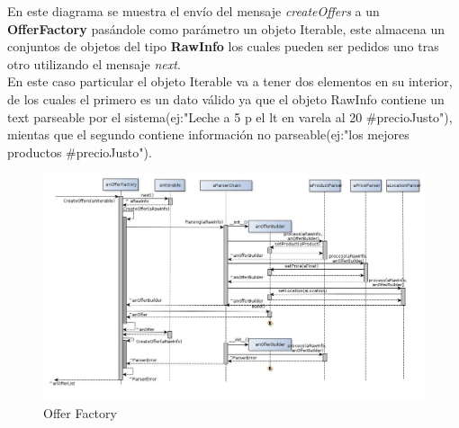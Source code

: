 \documentclass[10pt, a4paper]{article}
\begin{document}
\begin{landscape}

En este diagrama se muestra el envío del mensaje \emph{createOffers} a un \textbf{OfferFactory} pasándole como parámetro un objeto Iterable, este almacena un conjuntos de objetos del tipo \textbf{RawInfo} los cuales pueden ser pedidos uno tras otro utilizando el mensaje \emph{next}. \\

En este caso particular el objeto Iterable va a tener dos elementos en su interior, de los cuales el primero es un dato válido ya que el objeto RawInfo contiene un text parseable por el sistema(ej:"Leche a 5 p el lt en varela al 20 \#precioJusto"), mientas que el segundo contiene información no parseable(ej:"los mejores productos \#precioJusto").
\begin{figure}[H]
\centering
\includegraphics[scale=0.55]{graphics/OfferFactory_sequence.jpg}
\caption{Offer Factory}
\end{figure}

\end{landscape}


%
%
%
\end{document}
